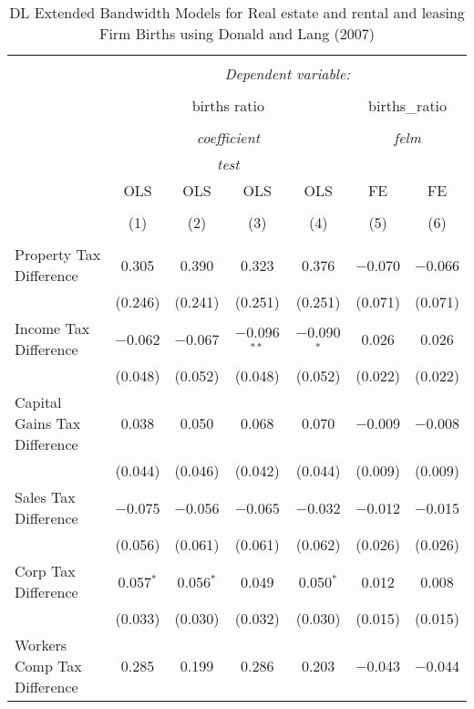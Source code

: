 
\begin{table}[!htbp] \centering 
  \caption{DL Extended Bandwidth Models for  Real estate and rental and leasing Firm Births using Donald and Lang (2007)} 
  \label{} 
\begin{tabular}{@{\extracolsep{5pt}}lcccccc} 
\\[-1.8ex]\hline 
\hline \\[-1.8ex] 
 & \multicolumn{6}{c}{\textit{Dependent variable:}} \\ 
\cline{2-7} 
\\[-1.8ex] & \multicolumn{4}{c}{births ratio} & \multicolumn{2}{c}{births\_ratio} \\ 
\\[-1.8ex] & \multicolumn{4}{c}{\textit{coefficient}} & \multicolumn{2}{c}{\textit{felm}} \\ 
 & \multicolumn{4}{c}{\textit{test}} & \multicolumn{2}{c}{\textit{}} \\ 
 & OLS & OLS & OLS & OLS & FE & FE \\ 
\\[-1.8ex] & (1) & (2) & (3) & (4) & (5) & (6)\\ 
\hline \\[-1.8ex] 
 Property Tax Difference & 0.305 & 0.390 & 0.323 & 0.376 & $-$0.070 & $-$0.066 \\ 
  & (0.246) & (0.241) & (0.251) & (0.251) & (0.071) & (0.071) \\ 
  Income Tax Difference & $-$0.062 & $-$0.067 & $-$0.096$^{**}$ & $-$0.090$^{*}$ & 0.026 & 0.026 \\ 
  & (0.048) & (0.052) & (0.048) & (0.052) & (0.022) & (0.022) \\ 
  Capital Gains Tax Difference & 0.038 & 0.050 & 0.068 & 0.070 & $-$0.009 & $-$0.008 \\ 
  & (0.044) & (0.046) & (0.042) & (0.044) & (0.009) & (0.009) \\ 
  Sales Tax Difference & $-$0.075 & $-$0.056 & $-$0.065 & $-$0.032 & $-$0.012 & $-$0.015 \\ 
  & (0.056) & (0.061) & (0.061) & (0.062) & (0.026) & (0.026) \\ 
  Corp Tax Difference & 0.057$^{*}$ & 0.056$^{*}$ & 0.049 & 0.050$^{*}$ & 0.012 & 0.008 \\ 
  & (0.033) & (0.030) & (0.032) & (0.030) & (0.015) & (0.015) \\ 
  Workers Comp Tax Difference & 0.285 & 0.199 & 0.286 & 0.203 & $-$0.043 & $-$0.044 \\ 

\end{tabular}
\end{table}
